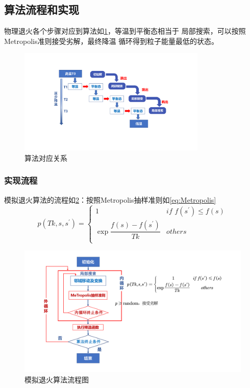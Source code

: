 \documentclass{nudt}
\begin{document}
\subsection{算法流程和实现}
物理退火各个步骤对应到算法如\cref{fig:a2SA}，等温到平衡态相当于
局部搜索，可以按照Metropolis准则接受劣解，最终降温
循环得到粒子能量最低的状态。
\begin{figure}[H]
	\centering
	\includegraphics[width=0.80\textwidth]{image/a2sa.pdf}
	\caption{算法对应关系}
	\label{fig:a2SA}
\end{figure}
\subsubsection{实现流程}
模拟退火算法的流程如\cref{fig:SA}：按照Metropolis抽样准则如\cref{eq:Metropolis}
\begin{equation}\label{eq:Metropolis}
	p\left( Tk,s,s^{'} \right) = \left\{ \begin{array}{lr}
		1&		if\,\,f\left( s^{'} \right) \le f\left( s \right)\\
		\exp{\dfrac{f\left( s \right) -f\left( s^{'} \right)}{Tk}}&		others\\
	\end{array} \right. 
\end{equation}
\begin{figure}[H]
	\centering
	\includegraphics[width=\textwidth]{image/tenser.pdf}
	\caption{模拟退火算法流程图}
	\label{fig:SA}
\end{figure}
\end{document}
